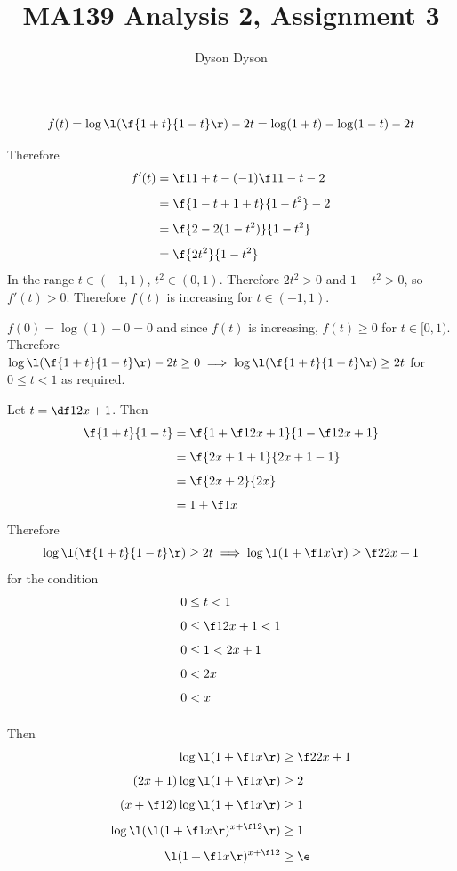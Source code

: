 \documentclass[a4paper]{article}
\title{MA139 Analysis 2, Assignment 3}
\author{Dyson Dyson}
\date{}
\begin{document}
\maketitle

\setlength{\parindent}{0em}
\setlength{\parskip}{1em}


$$f(t) = \log\l( \f{1+t}{1-t} \r) - 2t = \log(1+t) - \log(1-t) - 2t$$

Therefore \begin{align*}
f'(t) &= \f1{1+t} - (-1)\f1{1-t} - 2\\[1ex]
&= \f{1-t + 1+t}{1-t^2} - 2\\[1ex]
&= \f{2 - 2(1-t^2)}{1-t^2}\\[1ex]
&= \f{2t^2}{1-t^2}
\end{align*}
In the range $t \in (-1, 1)$, $t^2 \in (0, 1)$. Therefore $2t^2 > 0$ and $1 - t^2 > 0$, so $f'(t) > 0$. Therefore $f(t)$ is increasing for $t \in (-1, 1)$.

$f(0) = \log(1) - 0 = 0$ and since $f(t)$ is increasing, $f(t) \ge 0$ for $t \in [0, 1)$. Therefore $\log\l( \f{1+t}{1-t} \r) - 2t \ge 0 \implies \log\l( \f{1+t}{1-t} \r) \ge 2t$ for $0 \le t < 1$ as required.

Let $t = \df1{2x+1}$. Then \begin{align*}
\f{1+t}{1-t} &= \f{1 + \f1{2x+1}}{1 - \f1{2x+1}}\\[1ex]
&= \f{2x + 1 + 1}{2x + 1 - 1}\\[1ex]
&= \f{2x + 2}{2x}\\[1ex]
&= 1 + \f1x
\end{align*}
Therefore $$\log\l( \f{1+t}{1-t} \r) \ge 2t \implies \log\l( 1 + \f1x \r) \ge \f2{2x+1}$$
for the condition \begin{align*}
0 &\le t < 1\\[1ex]
0 &\le \f1{2x+1} < 1\\[1ex]
0 &\le 1 < 2x + 1\\[1ex]
0 &< 2x\\[1ex]
0 &< x\\[1ex]
\end{align*}

Then \begin{align*}
\log\l( 1 + \f1x \r) &\ge \f2{2x+1}\\[1ex]
(2x+1) \log\l( 1 + \f1x \r) &\ge 2\\[1ex]
(x + \f12) \log\l( 1 + \f1x \r) &\ge 1\\[1ex]
\log\l( \l( 1 + \f1x \r)^{x + \f12} \r) &\ge 1\\[1ex]
\l( 1 + \f1x \r)^{x + \f12} &\ge \e\\[1ex]
\end{align*}
\end{document}
